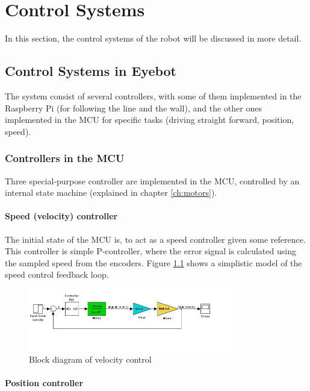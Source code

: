 \chapter{Control Systems}

In this section, the control systems of the robot will be discussed in more detail. 

\section{Control Systems in Eyebot}

The system consist of several controllers, with some of them implemented in the Raspberry Pi (for following the line and the wall), and the other ones implemented in the MCU for specific tasks (driving straight forward, position, speed). 

%
%
%
%
\subsection{Controllers in the MCU}

Three special-purpose controller are implemented in the MCU, controlled by an internal state machine (explained in chapter \ref{ch:motors}).   

\subsubsection{Speed (velocity) controller}

The initial state of the MCU is, to act as a speed controller given some reference. This controller is simple P-controller, where the error signal is calculated using the sampled speed from the encoders. Figure \ref{fig:control_1} shows a simplistic model of the speed control feedback loop.

\begin{figure}[!ht]
	\centering
	\includegraphics[width=0.8\textwidth]{resources/speed_blockdiagram}
	\caption{Block diagram of velocity control}
	\label{fig:control_1}
\end{figure}

\subsubsection{Position controller}

